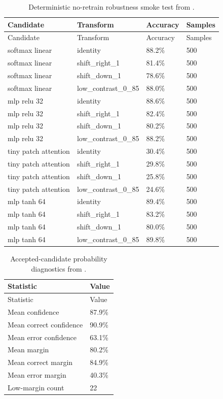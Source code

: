 \documentclass[
]{article}
\begin{document}
\begin{longtable}[]{@{}llll@{}}
\caption{Deterministic no-retrain robustness smoke test from
\protect{}.}\label{tbl:robustness-scores}\tabularnewline
\toprule\noalign{}
Candidate & Transform & Accuracy & Samples \\
\midrule\noalign{}
\endfirsthead
\toprule\noalign{}
Candidate & Transform & Accuracy & Samples \\
\midrule\noalign{}
\endhead
\bottomrule\noalign{}
\endlastfoot
softmax linear & identity & 88.2\% & 500 \\
softmax linear & shift\_right\_1 & 81.4\% & 500 \\
softmax linear & shift\_down\_1 & 78.6\% & 500 \\
softmax linear & low\_contrast\_0\_85 & 88.0\% & 500 \\
mlp relu 32 & identity & 88.6\% & 500 \\
mlp relu 32 & shift\_right\_1 & 82.4\% & 500 \\
mlp relu 32 & shift\_down\_1 & 80.2\% & 500 \\
mlp relu 32 & low\_contrast\_0\_85 & 88.2\% & 500 \\
tiny patch attention & identity & 30.4\% & 500 \\
tiny patch attention & shift\_right\_1 & 29.8\% & 500 \\
tiny patch attention & shift\_down\_1 & 25.8\% & 500 \\
tiny patch attention & low\_contrast\_0\_85 & 24.6\% & 500 \\
mlp tanh 64 & identity & 89.4\% & 500 \\
mlp tanh 64 & shift\_right\_1 & 83.2\% & 500 \\
mlp tanh 64 & shift\_down\_1 & 80.0\% & 500 \\
mlp tanh 64 & low\_contrast\_0\_85 & 89.8\% & 500 \\
\end{longtable}

\begin{longtable}[]{@{}ll@{}}
\caption{Accepted-candidate probability diagnostics from
\protect{}.}\label{tbl:probability-diagnostics}\tabularnewline
\toprule\noalign{}
Statistic & Value \\
\midrule\noalign{}
\endfirsthead
\toprule\noalign{}
Statistic & Value \\
\midrule\noalign{}
\endhead
\bottomrule\noalign{}
\endlastfoot
Mean confidence & 87.9\% \\
Mean correct confidence & 90.9\% \\
Mean error confidence & 63.1\% \\
Mean margin & 80.2\% \\
Mean correct margin & 84.9\% \\
Mean error margin & 40.3\% \\
Low-margin count & 22 \\
\end{longtable}
\end{document}
